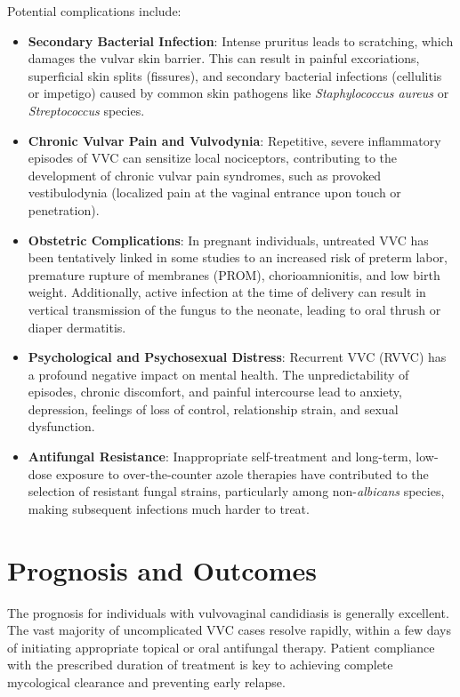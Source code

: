 Potential complications include:
\begin{itemize}
    \item \textbf{Secondary Bacterial Infection}: Intense pruritus leads to scratching, which damages the vulvar skin barrier. This can result in painful excoriations, superficial skin splits (fissures), and secondary bacterial infections (cellulitis or impetigo) caused by common skin pathogens like \textit{Staphylococcus aureus} or \textit{Streptococcus} species.
    \item \textbf{Chronic Vulvar Pain and Vulvodynia}: Repetitive, severe inflammatory episodes of VVC can sensitize local nociceptors, contributing to the development of chronic vulvar pain syndromes, such as provoked vestibulodynia (localized pain at the vaginal entrance upon touch or penetration).
    \item \textbf{Obstetric Complications}: In pregnant individuals, untreated VVC has been tentatively linked in some studies to an increased risk of preterm labor, premature rupture of membranes (PROM), chorioamnionitis, and low birth weight. Additionally, active infection at the time of delivery can result in vertical transmission of the fungus to the neonate, leading to oral thrush or diaper dermatitis.
    \item \textbf{Psychological and Psychosexual Distress}: Recurrent VVC (RVVC) has a profound negative impact on mental health. The unpredictability of episodes, chronic discomfort, and painful intercourse lead to anxiety, depression, feelings of loss of control, relationship strain, and sexual dysfunction.
    \item \textbf{Antifungal Resistance}: Inappropriate self-treatment and long-term, low-dose exposure to over-the-counter azole therapies have contributed to the selection of resistant fungal strains, particularly among non-\textit{albicans} species, making subsequent infections much harder to treat.
\end{itemize}

\section*{Prognosis and Outcomes}
The prognosis for individuals with vulvovaginal candidiasis is generally excellent. The vast majority of uncomplicated VVC cases resolve rapidly, within a few days of initiating appropriate topical or oral antifungal therapy. Patient compliance with the prescribed duration of treatment is key to achieving complete mycological clearance and preventing early relapse.


